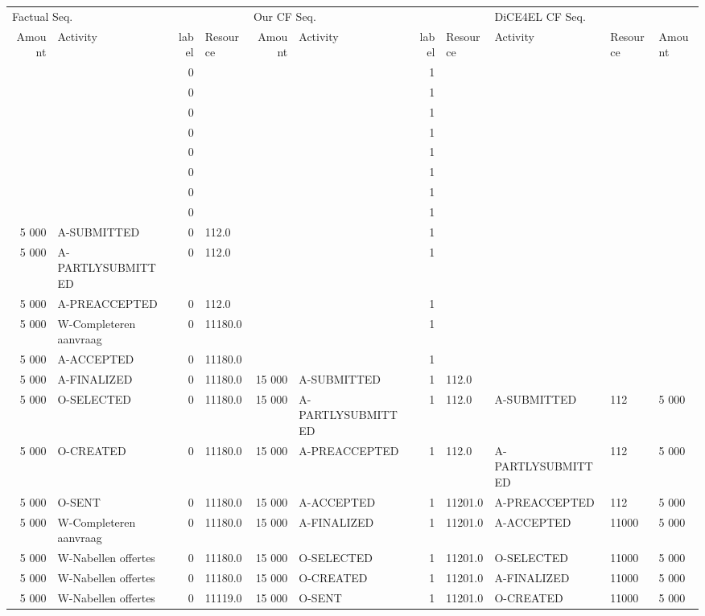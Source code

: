\begin{tabular}{rlrlrlrllll}
\toprule
\multicolumn{4}{l}{Factual Seq.} & \multicolumn{4}{l}{Our CF Seq.} & \multicolumn{3}{l}{DiCE4EL CF Seq.} \\
Amount & Activity & label & Resource & Amount & Activity & label & Resource & Activity & Resource & Amount \\
\midrule
 &  & 0 &  &  &  & 1 &  &  &  &  \\
 &  & 0 &  &  &  & 1 &  &  &  &  \\
 &  & 0 &  &  &  & 1 &  &  &  &  \\
 &  & 0 &  &  &  & 1 &  &  &  &  \\
 &  & 0 &  &  &  & 1 &  &  &  &  \\
 &  & 0 &  &  &  & 1 &  &  &  &  \\
 &  & 0 &  &  &  & 1 &  &  &  &  \\
 &  & 0 &  &  &  & 1 &  &  &  &  \\
5 000 & A-SUBMITTED & 0 & 112.0 &  &  & 1 &  &  &  &  \\
5 000 & A-PARTLYSUBMITTED & 0 & 112.0 &  &  & 1 &  &  &  &  \\
5 000 & A-PREACCEPTED & 0 & 112.0 &  &  & 1 &  &  &  &  \\
5 000 & W-Completeren aanvraag & 0 & 11180.0 &  &  & 1 &  &  &  &  \\
5 000 & A-ACCEPTED & 0 & 11180.0 &  &  & 1 &  &  &  &  \\
5 000 & A-FINALIZED & 0 & 11180.0 & 15 000 & A-SUBMITTED & 1 & 112.0 &  &  &  \\
5 000 & O-SELECTED & 0 & 11180.0 & 15 000 & A-PARTLYSUBMITTED & 1 & 112.0 & A-SUBMITTED & 112 & 5 000 \\
5 000 & O-CREATED & 0 & 11180.0 & 15 000 & A-PREACCEPTED & 1 & 112.0 & A-PARTLYSUBMITTED & 112 & 5 000 \\
5 000 & O-SENT & 0 & 11180.0 & 15 000 & A-ACCEPTED & 1 & 11201.0 & A-PREACCEPTED & 112 & 5 000 \\
5 000 & W-Completeren aanvraag & 0 & 11180.0 & 15 000 & A-FINALIZED & 1 & 11201.0 & A-ACCEPTED & 11000 & 5 000 \\
5 000 & W-Nabellen offertes & 0 & 11180.0 & 15 000 & O-SELECTED & 1 & 11201.0 & O-SELECTED & 11000 & 5 000 \\
5 000 & W-Nabellen offertes & 0 & 11180.0 & 15 000 & O-CREATED & 1 & 11201.0 & A-FINALIZED & 11000 & 5 000 \\
5 000 & W-Nabellen offertes & 0 & 11119.0 & 15 000 & O-SENT & 1 & 11201.0 & O-CREATED & 11000 & 5 000 \\

\end{tabular}
